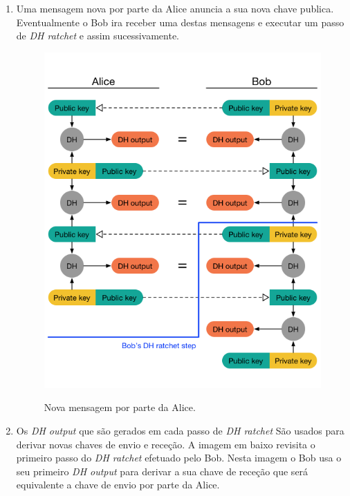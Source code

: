 \begin{enumerate}
    \item Uma mensagem nova por parte da Alice anuncia a sua nova chave publica. Eventualmente o Bob ira receber uma destas mensagens e executar um passo de \textit{DH ratchet} e assim sucessivamente.

    \begin{figure}[H]
        \begin{center}
            \includegraphics[width=12cm]{img/DH4.png}
            \label{diagram:DH4}
            \caption{Nova mensagem por parte da Alice.}
        \end{center}
    \end{figure}

    \item Os \textit{DH output} que são gerados em cada passo de \textit{DH ratchet} São usados para derivar novas chaves de envio e receção. A imagem em baixo revisita o primeiro passo do \textit{DH ratchet} efetuado pelo Bob. Nesta imagem o Bob usa o seu primeiro \textit{DH output} para derivar a sua chave de receção que será equivalente a chave de envio por parte da Alice.


\end{enumerate}
